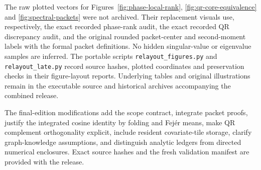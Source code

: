 \documentclass[11pt]{article}
\theoremstyle{definition}
\theoremstyle{remark}
\begin{document}
The raw plotted vectors for Figures~\ref{fig:phase-local-rank},
\ref{fig:qr-core-equivalence} and \ref{fig:spectral-packets} were not
archived. Their replacement visuals use, respectively, the exact recorded
phase-rank audit, the exact recorded QR discrepancy audit, and the original
rounded packet-center and second-moment labels with the formal packet
definitions. No hidden singular-value or eigenvalue samples are inferred.
The portable scripts \texttt{relayout\_figures.py} and
\texttt{relayout\_late.py} record source hashes, plotted coordinates and
preservation checks in their figure-layout reports. Underlying tables and
original illustrations remain in the executable source and historical
archives accompanying the combined release.

The final-edition modifications add the scope contract, integrate packet
proofs, justify the integrated cosine identity by folding and Fej\'er means,
make QR complement orthogonality explicit, include resident covariate-tile
storage, clarify graph-knowledge assumptions, and distinguish analytic
ledgers from directed numerical enclosures.  Exact source hashes and the
fresh validation manifest are provided with the release.
\end{document}
